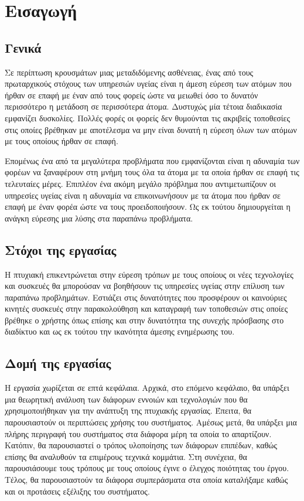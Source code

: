 \chapter{Εισαγωγή}
\leftmark\rightmark
\section{Γενικά}
Σε περίπτωση κρουσμάτων μιας μεταδιδόμενης ασθένειας, ένας από τους πρωταρχικούς στόχους των υπηρεσιών υγείας είναι η άμεση εύρεση των ατόμων που ήρθαν σε επαφή με έναν από τους φορείς ώστε να μειωθεί όσο το δυνατόν περισσότερο η μετάδοση σε περισσότερα άτομα. Δυστυχώς μία τέτοια διαδικασία εμφανίζει δυσκολίες. Πολλές φορές οι φορείς δεν θυμούνται τις ακριβείς τοποθεσίες στις οποίες βρέθηκαν με αποτέλεσμα να μην είναι δυνατή η εύρεση όλων των ατόμων με τους οποίους ήρθαν σε επαφή. 
\par
Επομένως ένα από τα μεγαλύτερα προβλήματα που εμφανίζονται είναι η αδυναμία των φορέων να ξαναφέρουν στη μνήμη τους όλα τα άτομα με τα οποία ήρθαν σε επαφή τις τελευταίες μέρες. Επιπλέον ένα ακόμη μεγάλο πρόβλημα που αντιμετωπίζουν οι υπηρεσίες υγείας είναι η αδυναμία να επικοινωνήσουν με τα άτομα που ήρθαν σε επαφή με έναν φορέα ώστε να τους προειδοποιήσουν. Ως εκ τούτου δημιουργείται η ανάγκη εύρεσης μια λύσης στα παραπάνω προβλήματα. 

\section{Στόχοι της εργασίας}
Η πτυχιακή επικεντρώνεται στην εύρεση τρόπων με τους οποίους οι νέες τεχνολογίες και συσκευές θα μπορούσαν να βοηθήσουν τις υπηρεσίες υγείας στην επίλυση των παραπάνω προβλημάτων. Εστιάζει στις δυνατότητες που προσφέρουν οι καινούριες κινητές συσκευές στην παρακολούθηση και καταγραφή των τοποθεσιών στις οποίες βρέθηκε ο χρήστης όπως επίσης και στην δυνατότητα της συνεχής πρόσβασης στο διαδίκτυο και ως εκ τούτου την ικανότητα άμεσης ενημέρωσης του.

\section{Δομή της εργασίας}
Η εργασία χωρίζεται σε επτά κεφάλαια. Αρχικά, στο επόμενο κεφάλαιο, θα υπάρξει μια θεωρητική ανάλυση των διάφορων εννοιών και τεχνολογιών που θα χρησιμοποιήθηκαν για την ανάπτυξη της πτυχιακής εργασίας. Έπειτα, θα παρουσιαστούν οι περιπτώσεις χρήσης του συστήματος. Αμέσως μετά, θα υπάρξει μια πλήρης περιγραφή του συστήματος στα διάφορα μέρη τα οποία το απαρτίζουν. Κατόπιν, θα παρουσιαστεί ο τρόπος υλοποίησης των διάφορων επιπέδων, καθώς επίσης θα αναλυθούν τα επιμέρους τεχνικά κομμάτια. Στη συνέχεια, θα παρουσιάσουμε τους τρόπους με τους οποίους έγινε ο έλεγχος ποιότητας του έργου. Τέλος, θα παρουσιαστούν τα διάφορα συμπεράσματα στα οποία καταλήξαμε καθώς και οι προτάσεις εξέλιξης του συστήματος.